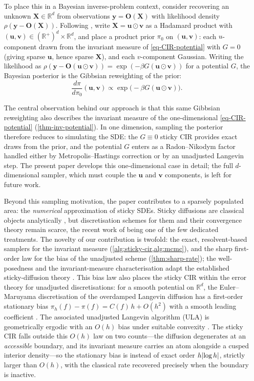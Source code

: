 \documentclass[aap,preprint]{imsart}
\DeclarePairedDelimiter{\vpair}{|}{|} %
\newcommand\abs[2][0pt]{\vpair*{#2}} %
\renewcommand{\vec}[1]{{\mathbf{#1}}}
\numberwithin{equation}{section}
\theoremstyle{plain}
\theoremstyle{definition}
\begin{document}
To place this in a Bayesian inverse-problem context, consider recovering an unknown $\vec X \in \mathbb{R}^d$ from observations $\vec y = \vec O(\vec X)$ with likelihood density $\rho(\vec y - \vec O(\vec X))$. Following \citet{Cheltsov2025-no}, write $\vec X = \vec u \odot \vec v$ as a Hadamard product with $(\vec u, \vec v) \in (\mathbb{R}^+)^d \times \mathbb{R}^d$, and place a product prior $\pi_0$ on $(\vec u,\vec v)$: each $u$-component drawn from the invariant measure of \cref{eq-CIR-potential} with $G=0$ (giving sparse $\vec u$, hence sparse $\vec X$), and each $v$-component Gaussian. Writing the likelihood as $\rho(\vec y - \vec O(\vec u \odot \vec v)) = \exp(-\beta G(\vec u \odot \vec v))$ for a potential $G$, the Bayesian posterior is the Gibbsian reweighting of the prior:
\[
  \frac{d\pi}{d\pi_0}(\vec u,\vec v)
   \propto  \exp\bigl(-\beta G(\vec u \odot \vec v)\bigr).
\]

The central observation behind our approach is that this same Gibbsian reweighting also describes the invariant measure of the one-dimensional \cref{eq-CIR-potential} (\cref{thm-inv-potential}). In one dimension, sampling the posterior therefore reduces to simulating the SDE: the $G\equiv 0$ sticky CIR provides exact draws from the prior, and the potential $G$ enters as a Radon--Nikodym factor handled either by Metropolis--Hastings correction or by an unadjusted Langevin step. The present paper develops this one-dimensional case in detail; the full $d$-dimensional sampler, which must couple the $\vec u$ and $\vec v$ components, is left for future work.

Beyond this sampling motivation, the paper contributes to a sparsely populated area: the \emph{numerical} approximation of sticky SDEs.  Sticky diffusions are classical objects analytically \citep{RogersWilliams2000, BorodinSalminen2002}, but discretisation schemes for them and their convergence theory remain scarce, the recent work of \citet{Sharma2025} being one of the few dedicated treatments.  The novelty of our contribution is twofold: the exact, resolvent-based samplers for the invariant measure (\cref{alg:sticky-cir,alg:mcmc}), and the sharp first-order law for the bias of the unadjusted scheme (\cref{thm:sharp-rate}); the well-posedness and the invariant-measure characterisation adapt the established sticky-diffusion theory \citep{Peskir2022,PeskirRoodman2023}.  This bias law also places the sticky CIR within the error theory for unadjusted discretisations: for a smooth potential on $\mathbb{R}^d$, the Euler--Maruyama discretisation of the overdamped Langevin diffusion has a first-order stationary bias $\pi_h(f)-\pi(f)=C(f)\,h+O(h^2)$ with a smooth leading coefficient \citep{TalayTubaro1990}. The associated unadjusted Langevin algorithm (ULA) is geometrically ergodic with an $O(h)$ bias under suitable convexity \citep{RobertsTweedie1996,DurmusMoulines2017}.  The sticky CIR falls outside this $O(h)$ law on two counts---the diffusion degenerates at an \emph{accessible} boundary, and its invariant measure carries an atom alongside a cusped interior density---so the stationary bias is instead of exact order $h\abs{\log h}$, strictly larger than $O(h)$, with the classical rate recovered precisely when the boundary is inactive.
\end{document}
